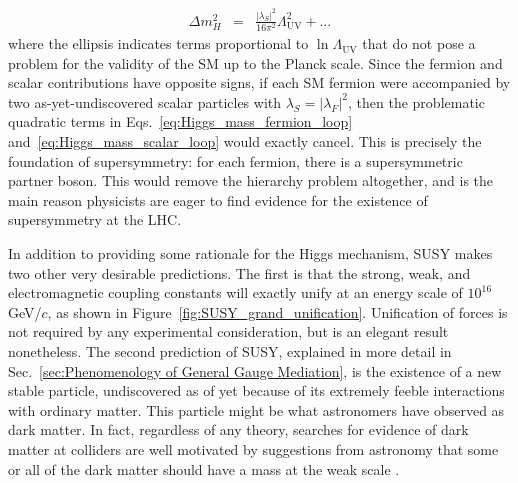 \documentclass[dissertation.tex]{subfiles}
\begin{document}
\begin{eqnarray}
\Delta m_{H}^{2} &=& \frac{|\lambda_{S}|^{2}}{16\pi^{2}}\Lambda_{\mathrm{UV}}^{2} + ...
\label{eq:Higgs_mass_scalar_loop}
\end{eqnarray}
%
where the ellipsis indicates terms proportional to $\ln\Lambda_{\mathrm{UV}}$ that do not pose a problem for the validity of the SM up to the Planck scale.  Since the fermion and scalar contributions have opposite signs, if each SM fermion were accompanied by two as-yet-undiscovered scalar particles with $\lambda_{S} = |\lambda_{F}|^{2}$, then the problematic quadratic terms in Eqs.~\ref{eq:Higgs_mass_fermion_loop} and~\ref{eq:Higgs_mass_scalar_loop} would exactly cancel.  This is precisely the foundation of supersymmetry: for each fermion, there is a supersymmetric partner boson.  This would remove the hierarchy problem altogether, and is the main reason physicists are eager to find evidence for the existence of supersymmetry at the LHC.

In addition to providing some rationale for the Higgs mechanism, SUSY makes two other very desirable predictions.  The first is that the strong, weak, and electromagnetic coupling constants will exactly unify at an energy scale of $10^{16}$ GeV/$c$, as shown in Figure~\ref{fig:SUSY_grand_unification}.  Unification of forces is not required by any experimental consideration, but is an elegant result nonetheless.  The second prediction of SUSY, explained in more detail in Sec.~\ref{sec:Phenomenology of General Gauge Mediation}, is the existence of a new stable particle, undiscovered as of yet because of its extremely feeble interactions with ordinary matter.  This particle might be what astronomers have observed as dark matter.  In fact, regardless of any theory, searches for evidence of dark matter at colliders are well motivated by suggestions from astronomy that some or all of the dark matter should have a mass at the weak scale \cite{Jungman}.
\end{document}
